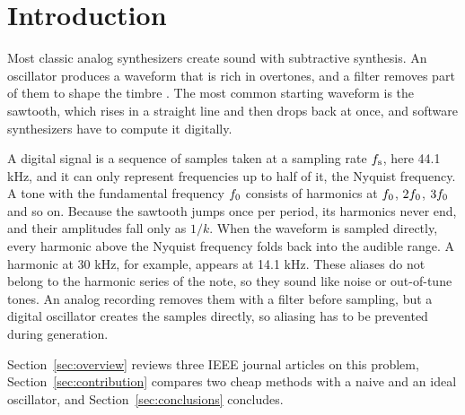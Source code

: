 \section{Introduction}

Most classic analog synthesizers create sound with subtractive synthesis.
An oscillator produces a waveform that is rich in overtones, and a filter
removes part of them to shape the timbre \cite{valimaki2007antialiasing}.
The most common starting waveform is the sawtooth, which rises in a
straight line and then drops back at once, and software synthesizers
have to compute it digitally.

A digital signal is a sequence of samples taken at a sampling rate $f_\mathrm{s}$,
here 44.1 kHz, and it can only represent frequencies up to half of it,
the Nyquist frequency. A tone with the fundamental frequency $f_0$
consists of harmonics at $f_0$, $2f_0$, $3f_0$ and so on. Because the
sawtooth jumps once per period, its harmonics never end, and their
amplitudes fall only as $1/k$. When the waveform is sampled directly,
every harmonic above the Nyquist frequency folds back into the audible
range. A harmonic at 30 kHz, for example, appears at
14.1 kHz. These aliases do not belong to the harmonic series of the note,
so they sound like noise or out-of-tune tones. An analog recording removes them with a filter before
sampling, but a digital oscillator creates the samples directly, so
aliasing has to be prevented during generation.

Section~\ref{sec:overview} reviews three IEEE journal articles on this
problem, Section~\ref{sec:contribution} compares two cheap methods with a
naive and an ideal oscillator, and Section~\ref{sec:conclusions}
concludes.
